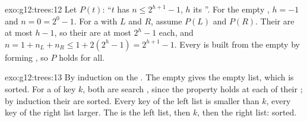 \begin{solution}{exo:g12:trees:12}
Let $P(t)$: ``$t$ has  $n \le 2^{h+1} - 1$, $h$ its ''. For the empty , $h = -1$ and
$n = 0 = 2^0 - 1$. For a  with  $L$ and $R$, assume $P(L)$ and $P(R)$. Their  are at most
$h - 1$, so their  are at most $2^h - 1$ each, and
$n = 1 + n_L + n_R \le 1 + 2(2^h - 1) = 2^{h+1} - 1$. Every  is built from the empty  by forming
, so $P$ holds for all.
\end{solution}

\begin{solution}{exo:g12:trees:13}
By induction on the . The empty  gives the empty list, which is sorted. For a  of key $k$, both 
are search , since the property holds at each of their ; by induction their  are sorted. Every key
of the left list is smaller than $k$, every key of the right list larger. The  is the left list, then $k$, then
the right list: sorted.
\end{solution}

